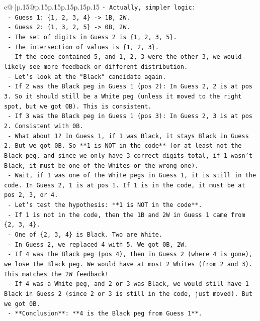 \documentclass{article}
\begin{document}
{\begin{supertabular}{c@{$\;$}|p{.15\linewidth}@{}p{.15\linewidth}p{.15\linewidth}p{.15\linewidth}p{.15\linewidth}p{.15\linewidth}}
{{{\texttt{{-} Actually, simpler logic:} \\
\texttt{  {-} Guess 1: \{1, 2, 3, 4\} {-}> 1B, 2W.} \\
\texttt{  {-} Guess 2: \{1, 3, 2, 5\} {-}> 0B, 2W.} \\
\texttt{  {-} The set of digits in Guess 2 is \{1, 2, 3, 5\}.} \\
\texttt{  {-} The intersection of values is \{1, 2, 3\}.} \\
\texttt{  {-} If the code contained 5, and 1, 2, 3 were the other 3, we would likely see more feedback or different distribution.} \\
\texttt{  {-} Let's look at the "Black" candidate again.} \\
\texttt{  {-} If 2 was the Black peg in Guess 1 (pos 2): In Guess 2, 2 is at pos 3. So it should still be a White peg (unless it moved to the right spot, but we got 0B). This is consistent.} \\
\texttt{  {-} If 3 was the Black peg in Guess 1 (pos 3): In Guess 2, 3 is at pos 2. Consistent with 0B.} \\
\texttt{  {-} What about 1? In Guess 1, if 1 was Black, it stays Black in Guess 2. But we got 0B. So **1 is NOT in the code** (or at least not the Black peg, and since we only have 3 correct digits total, if 1 wasn't Black, it must be one of the Whites or the wrong one).} \\
\texttt{  {-} Wait, if 1 was one of the White pegs in Guess 1, it is still in the code. In Guess 2, 1 is at pos 1. If 1 is in the code, it must be at pos 2, 3, or 4.} \\
\texttt{  {-} Let's test the hypothesis: **1 is NOT in the code**.} \\
\texttt{    {-} If 1 is not in the code, then the 1B and 2W in Guess 1 came from \{2, 3, 4\}.} \\
\texttt{    {-} One of \{2, 3, 4\} is Black. Two are White.} \\
\texttt{    {-} In Guess 2, we replaced 4 with 5. We got 0B, 2W.} \\
\texttt{    {-} If 4 was the Black peg (pos 4), then in Guess 2 (where 4 is gone), we lose the Black peg. We would have at most 2 Whites (from 2 and 3). This matches the 2W feedback!} \\
\texttt{    {-} If 4 was a White peg, and 2 or 3 was Black, we would still have 1 Black in Guess 2 (since 2 or 3 is still in the code, just moved). But we got 0B.} \\
\texttt{    {-} **Conclusion**: **4 is the Black peg from Guess 1**.} \\
}}}
\end{supertabular}}
\end{document}
